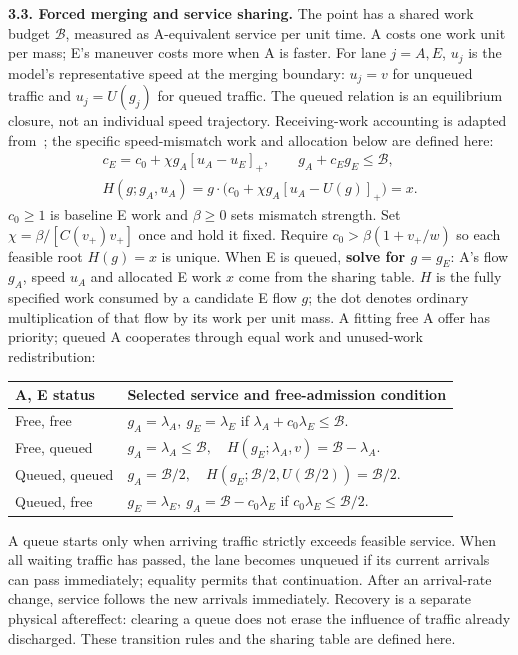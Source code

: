 \documentclass[10pt,a4paper]{article}
\newcommand{\pos}[1]{[#1]_+}
\newcommand{\bud}{\mathcal B}
\begin{document}
\newpage
\textbf{3.3. Forced merging and service sharing.}
The point has a shared work budget $\bud$, measured as A-equivalent service
per unit time. A costs one work unit per mass; E's maneuver costs more
when A is faster. For lane $j=A,E$, $u_j$ is the model's representative
speed at the merging boundary: $u_j=v$ for unqueued traffic and
$u_j=U(g_j)$ for queued traffic. The queued relation is an equilibrium
closure, not an individual speed trajectory.
Receiving-work accounting is adapted from~\cite{carey}; the specific
speed-mismatch work and allocation below are defined here:
\begin{equation}
 \begin{gathered}
 c_E=c_0+\chi g_A\pos{u_A-u_E},\qquad
 g_A+c_Eg_E\leq\bud,\\
 H(g;g_A,u_A)=g\cdot\bigl(c_0+\chi g_A\pos{u_A-U(g)}\bigr)=x.
 \end{gathered}
 \label{eq:work}
\end{equation}
$c_0\geq1$ is baseline E work and $\beta\geq0$ sets mismatch strength.
Set $\chi=\beta/[C(v_+)v_+]$ once and hold it fixed.
Require $c_0>\beta(1+v_+/w)$ so each feasible root $H(g)=x$
is unique.
When E is queued, \textbf{solve for $g=g_E$}: A's flow $g_A$, speed
$u_A$ and allocated E work $x$ come from the sharing table. $H$ is the fully
specified work consumed by a candidate E flow $g$; the dot denotes ordinary
multiplication of that flow by its work per unit mass.
A fitting free A offer has
priority; queued A cooperates through equal work and unused-work redistribution:
\begin{center}
\setlength{\tabcolsep}{5pt}
\begin{tabular}{@{}ll@{}}
\toprule
A, E status & Selected service and free-admission condition\\
\midrule
Free, free & $g_A=\lambda_A,\ g_E=\lambda_E$ if
$\lambda_A+c_0\lambda_E\leq\bud$.\\
Free, queued & $g_A=\lambda_A\leq\bud,\quad
H(g_E;\lambda_A,v)=\bud-\lambda_A$.\\
Queued, queued & $g_A=\bud/2,\quad
H(g_E;\bud/2,U(\bud/2))=\bud/2$.\\
Queued, free & $g_E=\lambda_E,\ g_A=\bud-c_0\lambda_E$ if
$c_0\lambda_E\leq\bud/2$.\\
\bottomrule
\end{tabular}
\end{center}
A queue starts only when arriving traffic strictly exceeds feasible service.
When all waiting traffic has passed, the lane becomes unqueued if its
current arrivals can pass immediately; equality permits that continuation.
After an arrival-rate change, service follows the new arrivals immediately.
Recovery is a separate physical aftereffect: clearing a queue does not erase
the influence of traffic already discharged. These transition rules and
the sharing table are defined here.
\end{document}
